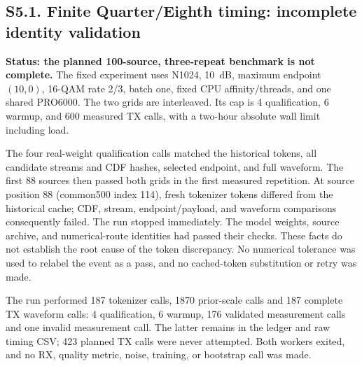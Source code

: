 \clearpage\subsection*{S5.1. Finite Quarter/Eighth timing: incomplete identity validation}
\textbf{Status: the planned 100-source, three-repeat benchmark is not complete.} The fixed experiment uses N1024, 10~dB, maximum endpoint $(10,0)$, 16-QAM rate 2/3, batch one, fixed CPU affinity/threads, and one shared PRO6000. The two grids are interleaved. Its cap is 4 qualification, 6 warmup, and 600 measured TX calls, with a two-hour absolute wall limit including load.

The four real-weight qualification calls matched the historical tokens, all candidate streams and CDF hashes, selected endpoint, and full waveform. The first 88 sources then passed both grids in the first measured repetition. At source position 88 (common500 index 114), fresh tokenizer tokens differed from the historical cache; CDF, stream, endpoint/payload, and waveform comparisons consequently failed. The run stopped immediately. The model weights, source archive, and numerical-route identities had passed their checks. These facts do not establish the root cause of the token discrepancy. No numerical tolerance was used to relabel the event as a pass, and no cached-token substitution or retry was made.

The run performed 187 tokenizer calls, 1870 prior-scale calls and 187 complete TX waveform calls: 4 qualification, 6 warmup, 176 validated measurement calls and one invalid measurement call. The latter remains in the ledger and raw timing CSV; 423 planned TX calls were never attempted. Both workers exited, and no RX, quality metric, noise, training, or bootstrap call was made.

